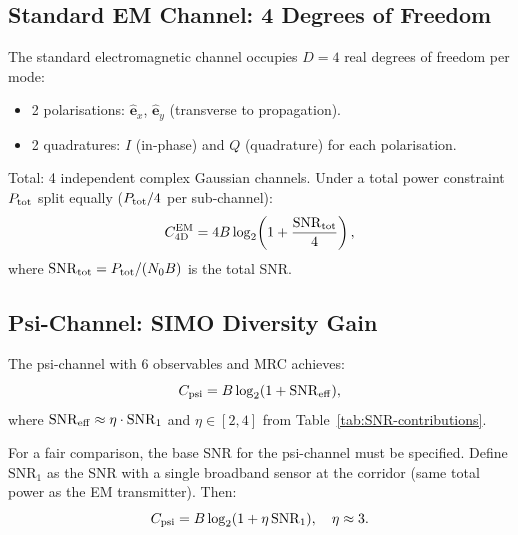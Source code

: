 \documentclass[aps,prd,twocolumn,superscriptaddress,nofootinbib]{revtex4-2}
\newcommand{\SNR}{\mathrm{SNR}}
\begin{document}
\subsection{Standard EM Channel: 4 Degrees of Freedom}

The standard electromagnetic channel occupies $D = 4$ real degrees of
freedom per mode:
\begin{itemize}
\item 2 polarisations: $\hat{\mathbf{e}}_x$, $\hat{\mathbf{e}}_y$
  (transverse to propagation).
\item 2 quadratures: $I$ (in-phase) and $Q$ (quadrature) for each
  polarisation.
\end{itemize}
Total: 4 independent complex Gaussian channels. Under a total power
constraint $P_{\rm tot}$ split equally ($P_{\rm tot}/4$ per sub-channel):
\begin{equation}
C_{\rm 4D}^{\rm EM} = 4B\log_2\!\left(1 + \frac{\SNR_{\rm tot}}{4}\right),
\label{eq:C4D}
\end{equation}
where $\SNR_{\rm tot} = P_{\rm tot}/(N_0 B)$ is the total SNR.

\subsection{Psi-Channel: SIMO Diversity Gain}

The psi-channel with 6 observables and MRC achieves:
\begin{equation}
C_{\rm psi} = B\log_2(1 + \SNR_{\rm eff}),
\label{eq:C-psi}
\end{equation}
where $\SNR_{\rm eff} \approx \eta \cdot \SNR_1$ and $\eta \in [2, 4]$
from Table~\ref{tab:SNR-contributions}.

For a fair comparison, the base SNR for the psi-channel must be specified.
Define $\SNR_1$ as the SNR with a single broadband sensor at the
corridor (same total power as the EM transmitter). Then:
\begin{equation}
C_{\rm psi} = B\log_2(1 + \eta\,\SNR_1), \quad \eta \approx 3.
\label{eq:C-psi-eta}
\end{equation}

\end{document}
